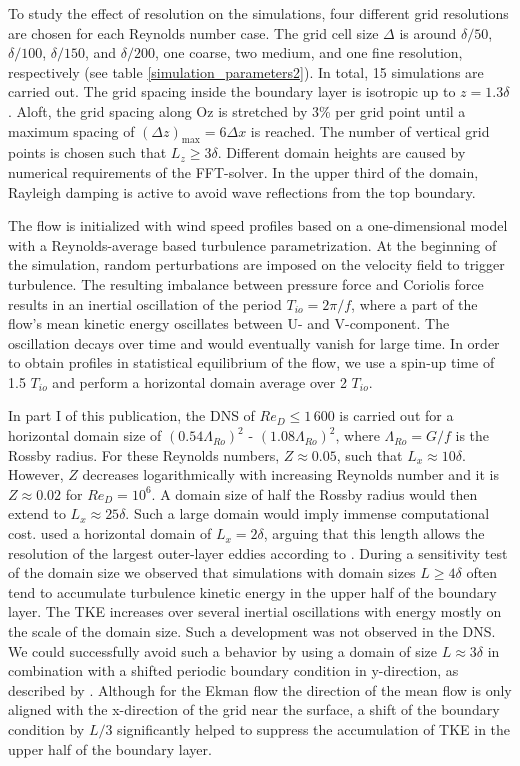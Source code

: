 \documentclass[smallcondensed,final]{svjour3}
\begin{document}
To study the effect of resolution on the simulations, four different grid resolutions are chosen for each Reynolds number case. The grid cell size $\Delta$ is around $\delta/50$, $\delta/100$, $\delta/150$, and $\delta/200$, one coarse, two medium, and one fine resolution, respectively (see table \ref{simulation_parameters2}). In total, 15 simulations are carried out. The grid spacing inside the boundary layer is isotropic up to $z = 1.3\delta$. Aloft, the grid spacing along Oz is stretched by 3\% per grid point until a maximum spacing of $(\Delta z )_\mathrm{max} = 6\Delta x$ is reached. The number of vertical grid points is chosen such that $L_z \ge 3 \delta$. Different domain heights are caused by numerical requirements of the FFT-solver. In the upper third of the domain, Rayleigh damping is active to avoid wave reflections from the top boundary.

The flow is initialized with wind speed profiles based on a one-dimensional model with a Reynolds-average based turbulence parametrization. At the beginning of the simulation, random perturbations are imposed on the velocity field to trigger turbulence. The resulting imbalance between pressure force and Coriolis force results in an inertial oscillation of the period $T_{io}=2\pi/f$, where a part of the flow's mean kinetic energy oscillates between U- and V-component. The oscillation decays over time and would eventually vanish for large time. In order to obtain profiles in statistical equilibrium of the flow, we use a spin-up time of 1.5 $T_{io}$ and perform a horizontal domain average over 2 $T_{io}$.

In part I of this publication, the DNS of $Re_D\leq1\,600$ is carried out for a horizontal domain size of $(0.54\Lambda_{Ro})^2$ - $(1.08\Lambda_{Ro})^2$, where $\Lambda_{Ro}=G/f$ is the Rossby radius. For these Reynolds numbers, $Z\approx 0.05$, such that $L_x \approx 10 \delta$. However, $Z$ decreases logarithmically with increasing Reynolds number and it is $Z\approx 0.02$ for $Re_D=10^6$. A domain size of half the Rossby radius would then extend to $L_x\approx 25\delta$. Such a large domain would imply immense computational cost. \cite{spalart2008direct} used a horizontal domain of $L_x = 2\delta$, arguing that this length allows the resolution of the largest outer-layer eddies according to \cite{csanady1967resistance}. During a sensitivity test of the domain size we observed that simulations with domain sizes $L\geq 4\delta$ often tend to accumulate turbulence kinetic energy in the upper half of the boundary layer. The TKE increases over several inertial oscillations with energy mostly on the scale of the domain size. Such a development was not observed in the DNS. We could successfully avoid such a behavior by using a domain of size $L \approx 3\delta$ in combination with a shifted periodic boundary condition in y-direction, as described by \cite{munters2016shifted}. Although for the Ekman flow the direction of the mean flow is only aligned with the x-direction of the grid near the surface, a shift of the boundary condition by $L/3$ significantly helped to suppress the accumulation of TKE in the upper half of the boundary layer.
\end{document}
